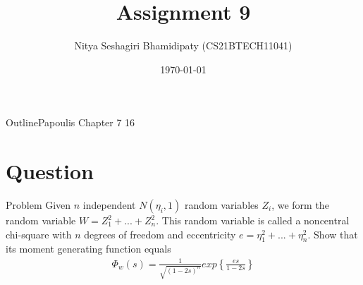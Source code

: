 \documentclass{beamer}
\title{Assignment 9}
\author{Nitya Seshagiri Bhamidipaty (CS21BTECH11041)}
\date{\today}
\providecommand{\cbrak}[1]{\ensuremath{\left\{#1\right\}}}
\begin{document}
\begin{frame}
    \titlepage 
\end{frame}
\logo{}
\begin{frame}{Outline}{Papoulis Chapter 7 16}
    \tableofcontents
\end{frame}
\section{Question}
\begin{frame}{Problem}
Given $n$ independent $N(\eta_i,1)$ random variables $Z_i$, we form the random variable $W = Z_1^2+...+Z_n^2$. This random variable is called a noncentral chi-square with $n$ degrees of freedom and eccentricity $e = \eta_1^2 + ... + \eta_n^2$. Show that its moment generating function equals 
\begin{align}
    \Phi_w(s) = \frac{1}{\sqrt{(1-2s)^n}}exp\cbrak{\frac{es}{1-2s}}
\end{align}
\end{frame}
\end{document}
